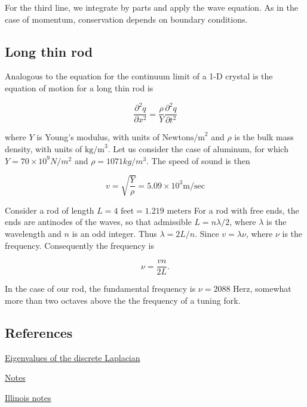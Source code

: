 For the third line, we integrate by parts and apply the wave equation.  As in the case of momentum, conservation depends on boundary conditions.

\subsection{Long thin rod}

Analogous to the equation for the continuum limit of a 1-D crystal is the equation of motion for a long thin rod is

\begin{equation}
\frac{\partial^2 q}{\partial x^2}
= \frac{\rho}{Y}\frac{\partial^2 q}{\partial t^2}
\end{equation}

where $Y$ is Young's modulus, with units of $\text{Newtons/m}^2$ and
$\rho$ is the bulk mass density, with units of $\text{kg/m}^3$.  Let us consider the case of aluminum, for which $Y = 70\times 10^9 N/m^2$ and
$\rho = 1071 kg/m^3$.  The speed of sound is then

\begin{equation}
v = \sqrt{\frac{Y}{\rho}} = 5.09 \times 10^3 \text{m/sec}
\end{equation}

Consider a rod of length $L = 4 \text{ feet} = 1.219 \text{ meters}$
For a rod with free ends, the ends are antinodes of the waves, so that admissible $L = n\lambda/2$, where $\lambda$ is the wavelength and $n$ is an odd integer.  Thus $\lambda = 2L/n$.  Since $v = \lambda \nu$, where $\nu$ is the frequency.  Consequently the frequency is

\begin{equation}
\nu = \frac{vn}{2L} .
\end{equation}

In the case of our rod, the fundamental frequency is $\nu = 2088 \text{ Herz}$, somewhat more than two octaves above the the frequency of a tuning fork.



\subsection{References}

\begin{thebibliography}

\href{
https://en.wikipedia.org/wiki/Eigenvalues_and_eigenvectors_of_the_second_derivative}{Eigenvalues of the discrete Laplacian}

\href{http://digitalcommons.usu.edu/cgi/viewcontent.cgi?article=1004&context=foundation_wave}{Notes}

\href{https://courses.physics.illinois.edu/phys193/Lecture_Notes/Vibrating_Rod/Longitudinally_Vibrating_Singing_Rod.pdf}{Illinois notes}

\end{thebibliography}
